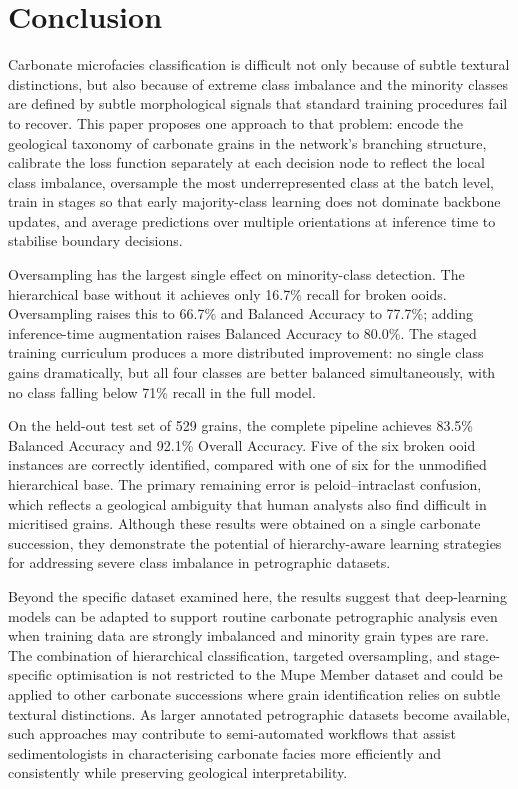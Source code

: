 \documentclass[a4paper,fleqn]{cas-dc}
\begin{document}
\section{Conclusion}

Carbonate microfacies classification is difficult not only because of subtle textural distinctions, but also because of extreme class imbalance and the minority classes are defined by subtle morphological signals that standard training procedures fail to recover. This paper proposes one approach to that problem: encode the geological taxonomy of carbonate grains in the network's branching structure, calibrate the loss function separately at each decision node to reflect the local class imbalance, oversample the most underrepresented class at the batch level, train in stages so that early majority-class learning does not dominate backbone updates, and average predictions over multiple orientations at inference time to stabilise boundary decisions.

Oversampling has the largest single effect on minority-class detection. The hierarchical base without it achieves only 16.7\% recall for broken ooids. Oversampling raises this to 66.7\% and Balanced Accuracy to 77.7\%; adding inference-time augmentation raises Balanced Accuracy to 80.0\%. The staged training curriculum produces a more distributed improvement: no single class gains dramatically, but all four classes are better balanced simultaneously, with no class falling below 71\% recall in the full model.

On the held-out test set of 529 grains, the complete pipeline achieves 83.5\% Balanced Accuracy and 92.1\% Overall Accuracy. Five of the six broken ooid instances are correctly identified, compared with one of six for the unmodified hierarchical base. The primary remaining error is peloid--intraclast confusion, which reflects a geological ambiguity that human analysts also find difficult in micritised grains. Although these results were obtained on a single carbonate succession, they demonstrate the potential of hierarchy-aware learning strategies for addressing severe class imbalance in petrographic datasets.

Beyond the specific dataset examined here, the results suggest that deep-learning models can be adapted to support routine carbonate petrographic analysis even when training data are strongly imbalanced and minority grain types are rare. The combination of hierarchical classification, targeted oversampling, and stage-specific optimisation is not restricted to the Mupe Member dataset and could be applied to other carbonate successions where grain identification relies on subtle textural distinctions. As larger annotated petrographic datasets become available, such approaches may contribute to semi-automated workflows that assist sedimentologists in characterising carbonate facies more efficiently and consistently while preserving geological interpretability.
\end{document}
